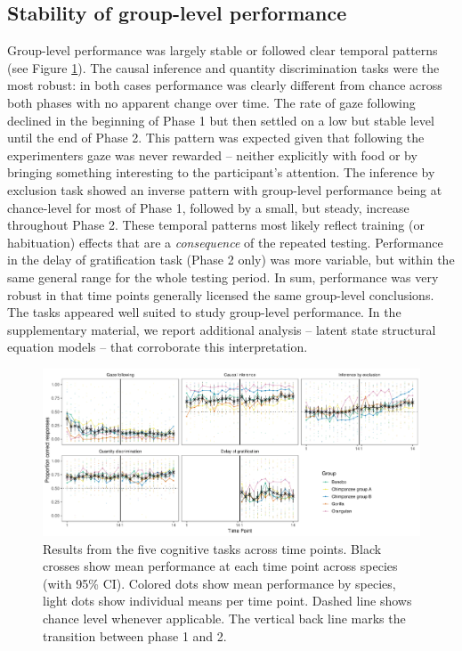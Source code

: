 \documentclass[
  man,floatsintext]{apa6}
\begin{document}
\hypertarget{stability-of-group-level-performance}{%
\subsection{Stability of group-level performance}\label{stability-of-group-level-performance}}

Group-level performance was largely stable or followed clear temporal patterns (see Figure \ref{fig:perfplot}). The causal inference and quantity discrimination tasks were the most robust: in both cases performance was clearly different from chance across both phases with no apparent change over time. The rate of gaze following declined in the beginning of Phase 1 but then settled on a low but stable level until the end of Phase 2. This pattern was expected given that following the experimenters gaze was never rewarded -- neither explicitly with food or by bringing something interesting to the participant's attention. The inference by exclusion task showed an inverse pattern with group-level performance being at chance-level for most of Phase 1, followed by a small, but steady, increase throughout Phase 2. These temporal patterns most likely reflect training (or habituation) effects that are a \emph{consequence} of the repeated testing. Performance in the delay of gratification task (Phase 2 only) was more variable, but within the same general range for the whole testing period. In sum, performance was very robust in that time points generally licensed the same group-level conclusions. The tasks appeared well suited to study group-level performance. In the supplementary material, we report additional analysis -- latent state structural equation models -- that corroborate this interpretation.

\begin{figure}
\includegraphics[width=1\linewidth]{./figures/performance} \caption{Results from the five cognitive tasks across time points. Black crosses show mean performance at each time point across species (with 95\% CI). Colored dots show mean performance by species, light dots show individual means per time point. Dashed line shows chance level whenever applicable. The vertical back line marks the transition between phase 1 and 2.}\label{fig:perfplot}
\end{figure}
\end{document}
